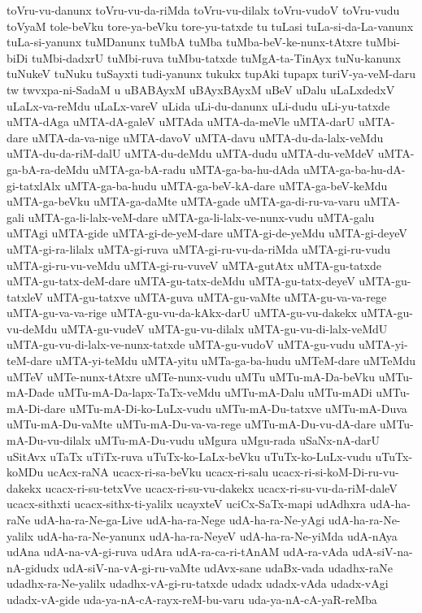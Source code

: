 {toVru-vu-danunx
toVru-vu-da-riMda
toVru-vu-dilalx
toVru-vudoV
toVru-vudu
toVyaM
tole-beVku
tore-ya-beVku
tore-yu-tatxde
tu
tuLasi
tuLa-si-da-La-vanunx
tuLa-si-yanunx
tuMDanunx
tuMbA
tuMba
tuMba-beV-ke-nunx-tAtxre
tuMbi-biDi
tuMbi-dadxrU
tuMbi-ruva
tuMbu-tatxde
tuMgA-ta-TinAyx
tuNu-kanunx
tuNukeV
tuNuku
tuSayxti
tudi-yanunx
tukukx
tupAki
tupapx
turiV-ya-veM-daru
tw
twvxpa-ni-SadaM
u
uBABAyxM
uBAyxBAyxM
uBeV
uDalu
uLaLxdedxV
uLaLx-va-reMdu
uLaLx-vareV
uLida
uLi-du-danunx
uLi-dudu
uLi-yu-tatxde
uMTA-dAga
uMTA-dA-galeV
uMTAda
uMTA-da-meVle
uMTA-darU
uMTA-dare
uMTA-da-va-nige
uMTA-davoV
uMTA-davu
uMTA-du-da-lalx-veMdu
uMTA-du-da-riM-dalU
uMTA-du-deMdu
uMTA-dudu
uMTA-du-veMdeV
uMTA-ga-bA-ra-deMdu
uMTA-ga-bA-radu
uMTA-ga-ba-hu-dAda
uMTA-ga-ba-hu-dA-gi-tatxlAlx
uMTA-ga-ba-hudu
uMTA-ga-beV-kA-dare
uMTA-ga-beV-keMdu
uMTA-ga-beVku
uMTA-ga-daMte
uMTA-gade
uMTA-ga-di-ru-va-varu
uMTA-gali
uMTA-ga-li-lalx-veM-dare
uMTA-ga-li-lalx-ve-nunx-vudu
uMTA-galu
uMTAgi
uMTA-gide
uMTA-gi-de-yeM-dare
uMTA-gi-de-yeMdu
uMTA-gi-deyeV
uMTA-gi-ra-lilalx
uMTA-gi-ruva
uMTA-gi-ru-vu-da-riMda
uMTA-gi-ru-vudu
uMTA-gi-ru-vu-veMdu
uMTA-gi-ru-vuveV
uMTA-gutAtx
uMTA-gu-tatxde
uMTA-gu-tatx-deM-dare
uMTA-gu-tatx-deMdu
uMTA-gu-tatx-deyeV
uMTA-gu-tatxleV
uMTA-gu-tatxve
uMTA-guva
uMTA-gu-vaMte
uMTA-gu-va-va-rege
uMTA-gu-va-va-rige
uMTA-gu-vu-da-kAkx-darU
uMTA-gu-vu-dakekx
uMTA-gu-vu-deMdu
uMTA-gu-vudeV
uMTA-gu-vu-dilalx
uMTA-gu-vu-di-lalx-veMdU
uMTA-gu-vu-di-lalx-ve-nunx-tatxde
uMTA-gu-vudoV
uMTA-gu-vudu
uMTA-yi-teM-dare
uMTA-yi-teMdu
uMTA-yitu
uMTa-ga-ba-hudu
uMTeM-dare
uMTeMdu
uMTeV
uMTe-nunx-tAtxre
uMTe-nunx-vudu
uMTu
uMTu-mA-Da-beVku
uMTu-mA-Dade
uMTu-mA-Da-lapx-TaTx-veMdu
uMTu-mA-Dalu
uMTu-mADi
uMTu-mA-Di-dare
uMTu-mA-Di-ko-LuLx-vudu
uMTu-mA-Du-tatxve
uMTu-mA-Duva
uMTu-mA-Du-vaMte
uMTu-mA-Du-va-va-rege
uMTu-mA-Du-vu-dA-dare
uMTu-mA-Du-vu-dilalx
uMTu-mA-Du-vudu
uMgura
uMgu-rada
uSaNx-nA-darU
uSitAvx
uTaTx
uTiTx-ruva
uTuTx-ko-LaLx-beVku
uTuTx-ko-LuLx-vudu
uTuTx-koMDu
ucAcx-raNA
ucacx-ri-sa-beVku
ucacx-ri-salu
ucacx-ri-si-koM-Di-ru-vu-dakekx
ucacx-ri-su-tetxVve
ucacx-ri-su-vu-dakekx
ucacx-ri-su-vu-da-riM-daleV
ucacx-sithxti
ucacx-sithx-ti-yalilx
ucayxteV
uciCx-SaTx-mapi
udAdhxra
udA-ha-raNe
udA-ha-ra-Ne-ga-Live
udA-ha-ra-Nege
udA-ha-ra-Ne-yAgi
udA-ha-ra-Ne-yalilx
udA-ha-ra-Ne-yanunx
udA-ha-ra-NeyeV
udA-ha-ra-Ne-yiMda
udA-nAya
udAna
udA-na-vA-gi-ruva
udAra
udA-ra-ca-ri-tAnAM
udA-ra-vAda
udA-siV-na-nA-gidudx
udA-siV-na-vA-gi-ru-vaMte
udAvx-sane
udaBx-vada
udadhx-raNe
udadhx-ra-Ne-yalilx
udadhx-vA-gi-ru-tatxde
udadx
udadx-vAda
udadx-vAgi
udadx-vA-gide
uda-ya-nA-cA-rayx-reM-bu-varu
uda-ya-nA-cA-yaR-reMba
}
